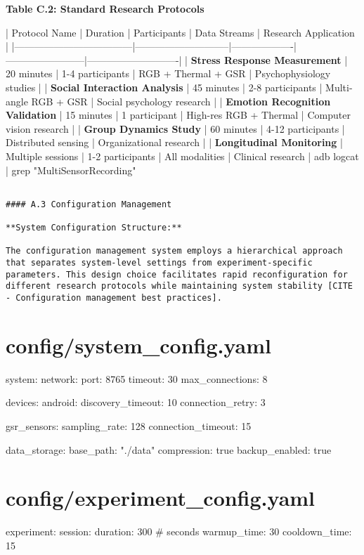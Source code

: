 \documentclass[12pt,a4paper]{article}
\begin{document}
\textbf{Table C.2: Standard Research Protocols}

| Protocol Name                      | Duration                    | Participants      | Data Streams           | Research Application       |
|------------------------------------|-----------------------------|-------------------|------------------------|----------------------------|
| \textbf{Stress Response Measurement}    | 20 minutes                  | 1-4 participants  | RGB + Thermal + GSR    | Psychophysiology studies   |
| \textbf{Social Interaction Analysis}    | 45 minutes                  | 2-8 participants  | Multi-angle RGB + GSR  | Social psychology research |
| \textbf{Emotion Recognition Validation} | 15 minutes                  | 1 participant     | High-res RGB + Thermal | Computer vision research   |
| \textbf{Group Dynamics Study}           | 60 minutes                  | 4-12 participants | Distributed sensing    | Organizational research    |
| \textbf{Longitudinal Monitoring}        | Multiple sessions           | 1-2 participants  | All modalities         | Clinical research          |
 adb logcat                         | grep "MultiSensorRecording" 

\begin{verbatim}

#### A.3 Configuration Management

**System Configuration Structure:**

The configuration management system employs a hierarchical approach that separates system-level settings from experiment-specific parameters. This design choice facilitates rapid reconfiguration for different research protocols while maintaining system stability [CITE - Configuration management best practices].

\end{verbatim}
\section{config/system_config.yaml}
system:
  network:
    port: 8765
    timeout: 30
    max\_connections: 8
  
  devices:
    android:
      discovery\_timeout: 10
      connection\_retry: 3
    
    gsr\_sensors:
      sampling\_rate: 128
      connection\_timeout: 15
  
  data\_storage:
    base\_path: "./data"
    compression: true
    backup\_enabled: true

\section{config/experiment_config.yaml}
experiment:
  session:
    duration: 300  \# seconds
    warmup\_time: 30
    cooldown\_time: 15
  
\end{document}
